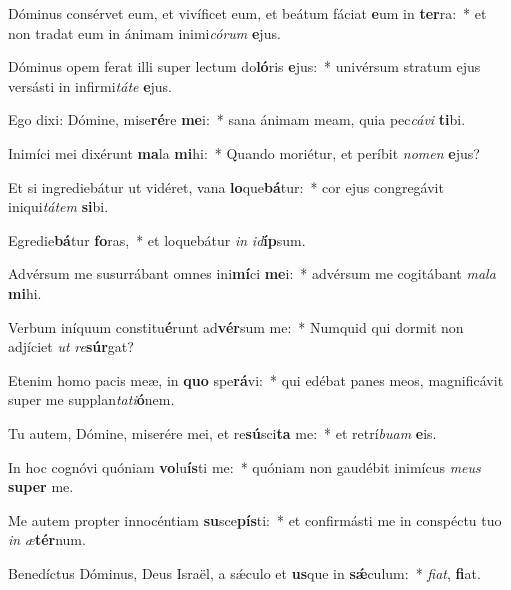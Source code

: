 \item Dóminus consérvet eum, et vivíficet eum, et beátum fáciat \textbf{e}um in \textbf{ter}ra:~* et non tradat eum in ánimam inimi\textit{có}\textit{rum} \textbf{e}jus.
\item Dóminus opem ferat illi super lectum do\textbf{ló}ris \textbf{e}jus:~* univérsum stratum ejus versásti in infirmi\textit{tá}\textit{te} \textbf{e}jus.
\item Ego dixi: Dómine, mise\textbf{ré}re \textbf{me}i:~* sana ánimam meam, quia pec\textit{cá}\textit{vi} \textbf{ti}bi.
\item Inimíci mei dixérunt \textbf{ma}la \textbf{mi}hi:~* Quando moriétur, et períbit \textit{no}\textit{men} \textbf{e}jus?
\item Et si ingrediebátur ut vidéret, vana \textbf{lo}que\textbf{bá}tur:~* cor ejus congregávit iniqui\textit{tá}\textit{tem} \textbf{si}bi.
\item Egredie\textbf{bá}tur \textbf{fo}ras,~* et loquebátur \textit{in} \textit{id}\textbf{íp}sum.
\item Advérsum me susurrábant omnes ini\textbf{mí}ci \textbf{me}i:~* advérsum me cogitábant \textit{ma}\textit{la} \textbf{mi}hi.
\item Verbum iníquum constitu\textbf{é}runt ad\textbf{vér}sum me:~* Numquid qui dormit non adjíciet \textit{ut} \textit{re}\textbf{súr}gat?
\item Etenim homo pacis meæ, in \textbf{quo} spe\textbf{rá}vi:~* qui edébat panes meos, magnificávit super me supplan\textit{ta}\textit{ti}\textbf{ó}nem.
\item Tu autem, Dómine, miserére mei, et re\textbf{sú}sci\textbf{ta} me:~* et retrí\textit{bu}\textit{am} \textbf{e}is.
\item In hoc cognóvi quóniam \textbf{vo}lu\textbf{ís}ti me:~* quóniam non gaudébit inimícus \textit{me}\textit{us} \textbf{su}\textbf{per} me.
\item Me autem propter innocéntiam \textbf{su}sce\textbf{pís}ti:~* et confirmásti me in conspéctu tuo \textit{in} \textit{æ}\textbf{tér}num.
\item Benedíctus Dóminus, Deus Israël, a sǽculo et \textbf{us}que in \textbf{sǽ}culum:~* \textit{fi}\textit{at}, \textbf{fi}at.
